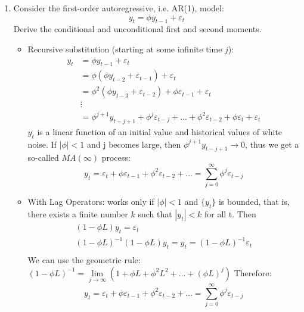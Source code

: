 \documentclass[a4paper]{scrartcl}
\begin{document}
    \begin{enumerate}
        \item Consider the first-order autoregressive, i.e. AR(1), model:  $$y_t = \phi y_{t-1} + \varepsilon_{t}$$ Derive the conditional and unconditional first and second moments.
              \begin{solution}
                  \begin{itemize}
                      \item Recursive substitution (starting at some infinite time $j$):
                            \begin{align*}
                                y_t & = \phi y_{t-1} + \varepsilon_t                                                                                      \\
                                    & = \phi \left( \phi y_{t-2} + \varepsilon_{t-1}\right) + \varepsilon_t                                               \\ 
                                    & = \phi^2(\phi y_{t-3} + \varepsilon_{t-2} ) + \phi \varepsilon_{t-1} + \varepsilon_t                                \\
                                    & \vdots                                                                                                              \\
                                    & = \phi^{j+1} y_{t-{j+1}}+\phi^j \varepsilon_{t-j}+...+\phi^2 \varepsilon_{t-2} + \phi \varepsilon_t + \varepsilon_t
                            \end{align*}
                            $y_t$ is a linear function of an initial value and historical values of white noise. If $|\phi|<1$ and j becomes large, then $ \phi^{j+1} y_{t-{j+1}} \rightarrow 0$, thus we get a so-called $MA(\infty)$ process:
                            $$y_t = \varepsilon_t + \phi \varepsilon_{t-1} + \phi^2 \varepsilon_{t-2}+... = \sum_{j=0}^\infty \phi^j \varepsilon_{t-j}$$
                      \item With Lag Operators: works only if $|\phi| < 1$ and $\{y_t\}$ is bounded, that is, there exists a finite number $k$ such that $|y_t| < k$ for all t. Then
                            \begin{align*}
                                (1-\phi L) y_t = \varepsilon_t                                    \\
                                (1-\phi L)^{-1}(1-\phi L) y_t =	y_t = (1-\phi L)^{-1}\varepsilon_t \\
                            \end{align*}
                            We can use the geometric rule: $(1-\phi L)^{-1} = \lim\limits_{j\rightarrow \infty}(1+\phi L + \phi^2 L^2+...+(\phi L)^j)$
                            Therefore:$$y_t = \varepsilon_t + \phi \varepsilon_{t-1} + \phi^2 \varepsilon_{t-2}+... = \sum_{j=0}^\infty \phi^j \varepsilon_{t-j}$$
                            

\end{itemize}
\end{solution}
\end{enumerate}
\end{document}
